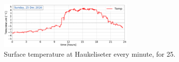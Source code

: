 \begin{figure}[H]
	\centering
	\includegraphics[width=0.6\textwidth]{./fig_weathermast/sfc_temp_20161225}
	\caption{Surface temperature at Haukeliseter every minute, for  \SI{25}{\dec}.}\label{fig:sfc_temp}
\end{figure}